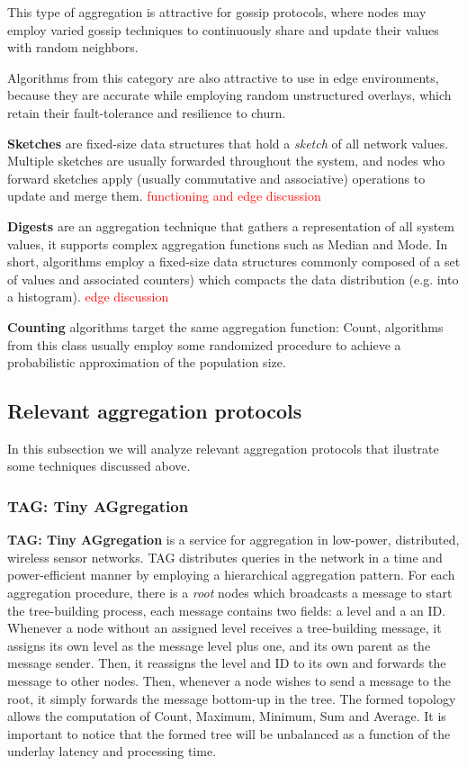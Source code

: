 This type of aggregation is attractive for gossip protocols, where nodes may employ varied gossip techniques to continuously share and update their values with random neighbors.

Algorithms from this category are also attractive to use in edge environments, because they are accurate while employing random unstructured overlays, which retain their fault-tolerance and resilience to churn.

\textbf{Sketches} are fixed-size data structures that hold a \textit{sketch} of all network values. Multiple sketches are usually forwarded throughout the system, and nodes who forward sketches apply (usually commutative and associative) operations to update and merge them. \textcolor{red}{functioning and edge discussion}


\textbf{Digests} are an aggregation technique that gathers a representation of all system values, it supports complex aggregation functions such as Median and Mode. In short, algorithms employ a fixed-size data structures commonly composed of a set of values and associated counters) which compacts the data distribution (e.g. into a histogram). \textcolor{red}{edge discussion}

\textbf{Counting} algorithms target the same aggregation function: Count, algorithms from this class usually employ some randomized procedure to achieve a probabilistic approximation of the population size.

\subsection{Relevant aggregation protocols}

In this subsection we will analyze relevant aggregation protocols that ilustrate some techniques discussed above.

\subsubsection{TAG: Tiny AGgregation}

\textbf{TAG: Tiny AGgregation}\cite{Madden2002} is a service for aggregation in low-power, distributed, wireless sensor networks. TAG distributes queries in the network in a time and power-efficient manner by employing a hierarchical aggregation pattern. For each aggregation procedure, there is a \textit{root} nodes which broadcasts a message to start the tree-building process, each message contains two fields: a level and a an ID. Whenever a node without an assigned level receives a tree-building message, it assigns its own level as the message level plus one, and its own parent as the message sender. Then, it reassigns the level and ID to its own and forwards the message to other nodes. Then, whenever a node wishes to send a message to the root, it simply forwards the message bottom-up in the tree. The formed topology allows the computation of Count, Maximum, Minimum, Sum and Average. It is important to notice that the formed tree will be unbalanced as a function of the underlay latency and processing time.

